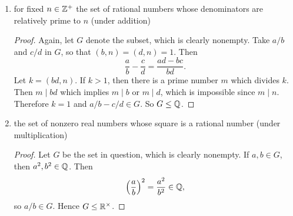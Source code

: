 \begin{enumerate}
\begin{proof}
    $G\leq\Q$.
  \end{proof}
\item for fixed $n\in\mathbb{Z}^+$ the set of rational numbers whose
  denominators are relatively prime to $n$ (under addition)
  \begin{proof}
    Again, let $G$ denote the subset, which is clearly nonempty. Take
    $a/b$ and $c/d$ in $G$, so that $(b,n) = (d,n) = 1$. Then
    \begin{equation*}
      \frac{a}b - \frac{c}d = \frac{ad - bc}{bd}.
    \end{equation*}
    Let $k = (bd, n)$. If $k > 1$, then there is a prime number $m$
    which divides $k$. Then $m\mid bd$ which implies $m\mid b$ or
    $m\mid d$, which is impossible since $m\mid n$. Therefore $k = 1$
    and $a/b - c/d \in G$. So $G\leq\Q$.
  \end{proof}
\item the set of nonzero real numbers whose square is a rational
  number (under multiplication)
  \begin{proof}
    Let $G$ be the set in question, which is clearly nonempty. If
    $a,b\in G$, then $a^2,b^2\in\mathbb{Q}$. Then
    \begin{equation*}
      \left(\frac{a}b\right)^2 = \frac{a^2}{b^2} \in \mathbb{Q},
    \end{equation*}
    so $a/b\in G$. Hence $G\leq\mathbb{R}^\times$.
  \end{proof}
\end{enumerate}

